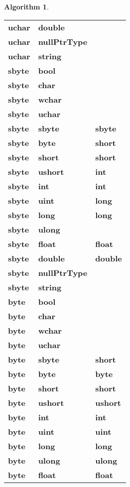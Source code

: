 \documentclass[a4paper,oneside,11pt]{book}
\theoremstyle{definition}
\newtheorem{algo}{Algorithm}[section]
\begin{document}
\begin{algo}
\begin{flushleft}
\begin{supertabular}{lll}
\textbf{uchar}& \textbf{double}& \\
\textbf{uchar}& \textbf{nullPtrType}& \\
\textbf{uchar}& \textbf{string}& \\
\hline
\textbf{sbyte}& \textbf{bool}&\\
\textbf{sbyte}& \textbf{char}& \\
\textbf{sbyte}& \textbf{wchar}& \\
\textbf{sbyte}& \textbf{uchar}& \\
\textbf{sbyte}& \textbf{sbyte}& \textbf{sbyte}\\
\textbf{sbyte}& \textbf{byte}& \textbf{short}\\
\textbf{sbyte}& \textbf{short}& \textbf{short}\\
\textbf{sbyte}& \textbf{ushort}& \textbf{int}\\
\textbf{sbyte}& \textbf{int}& \textbf{int}\\
\textbf{sbyte}& \textbf{uint}& \textbf{long}\\
\textbf{sbyte}& \textbf{long}& \textbf{long}\\
\textbf{sbyte}& \textbf{ulong}& \\
\textbf{sbyte}& \textbf{float}& \textbf{float}\\
\textbf{sbyte}& \textbf{double}& \textbf{double}\\
\textbf{sbyte}& \textbf{nullPtrType}& \\
\textbf{sbyte}& \textbf{string}& \\
\hline
\textbf{byte}& \textbf{bool}& \\
\textbf{byte}& \textbf{char}& \\
\textbf{byte}& \textbf{wchar}& \\
\textbf{byte}& \textbf{uchar}& \\
\textbf{byte}& \textbf{sbyte}& \textbf{short}\\
\textbf{byte}& \textbf{byte}& \textbf{byte}\\
\textbf{byte}& \textbf{short}& \textbf{short}\\
\textbf{byte}& \textbf{ushort}& \textbf{ushort}\\
\textbf{byte}& \textbf{int}& \textbf{int}\\
\textbf{byte}& \textbf{uint}& \textbf{uint}\\
\textbf{byte}& \textbf{long}& \textbf{long}\\
\textbf{byte}& \textbf{ulong}& \textbf{ulong}\\
\textbf{byte}& \textbf{float}& \textbf{float}\\

\end{supertabular}
\end{flushleft}
\end{algo}
\end{document}
